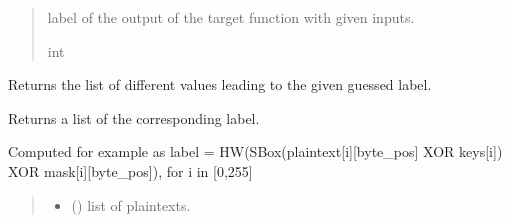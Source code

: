 \documentclass[letterpaper,10pt,english]{sphinxmanual}
\begin{document}
\begin{fulllineitems}
\begin{fulllineitems}
\begin{quote}
\begin{description}
\begin{itemize}
\end{itemize}

\sphinxAtStartPar
label of the output of the target function with given inputs.

\sphinxAtStartPar
int

\end{description}\end{quote}

\end{fulllineitems}


\begin{fulllineitems}
\label{\detokenize{MLSCAlib.Ciphers:MLSCAlib.Ciphers.leakage_model.LeakageModel.get_same_label_values}}
\pysigstartsignatures
{}
\pysigstopsignatures
\sphinxAtStartPar
Returns the list of different values leading to the given guessed label.

\end{fulllineitems}


\begin{fulllineitems}
\label{\detokenize{MLSCAlib.Ciphers:MLSCAlib.Ciphers.leakage_model.LeakageModel.get_small_profiling_labels}}
\pysigstartsignatures
{}
\pysigstopsignatures
\sphinxAtStartPar
Returns a list of the corresponding label.

\sphinxAtStartPar
Computed for example as label = HW(SBox(plaintext{[}i{]}{[}byte\_pos{]} XOR keys{[}i{]}) XOR mask{[}i{]}{[}byte\_pos{]}), for i in {[}0,255{]}
\begin{quote}\begin{description}
\begin{itemize}
\item {} 
\sphinxAtStartPar
{} (\sphinxstyleliteralemphasis{\sphinxupquote{{[}}}\sphinxstyleliteralemphasis{\sphinxupquote{{[}}}\sphinxstyleliteralemphasis{\sphinxupquote{{]}}}\sphinxstyleliteralemphasis{\sphinxupquote{{]}}}) \textendash{} list of plaintexts.


\end{itemize}
\end{description}
\end{quote}
\end{fulllineitems}
\end{fulllineitems}
\end{document}
